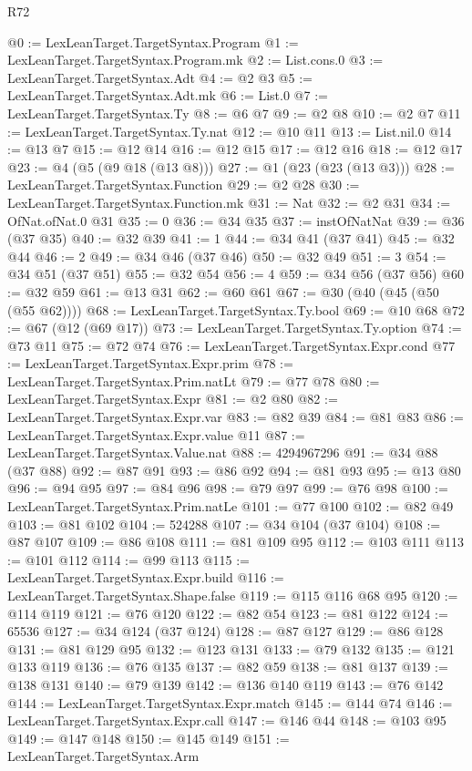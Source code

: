 \begin{lexlean}{R72}
\begin{coremodule}
@0 := LexLeanTarget.TargetSyntax.Program
@1 := LexLeanTarget.TargetSyntax.Program.mk
@2 := List.cons.{0}
@3 := LexLeanTarget.TargetSyntax.Adt
@4 := @2 @3
@5 := LexLeanTarget.TargetSyntax.Adt.mk
@6 := List.{0}
@7 := LexLeanTarget.TargetSyntax.Ty
@8 := @6 @7
@9 := @2 @8
@10 := @2 @7
@11 := LexLeanTarget.TargetSyntax.Ty.nat
@12 := @10 @11
@13 := List.nil.{0}
@14 := @13 @7
@15 := @12 @14
@16 := @12 @15
@17 := @12 @16
@18 := @12 @17
@23 := @4 (@5 (@9 @18 (@13 @8)))
@27 := @1 (@23 (@23 (@13 @3)))
@28 := LexLeanTarget.TargetSyntax.Function
@29 := @2 @28
@30 := LexLeanTarget.TargetSyntax.Function.mk
@31 := Nat
@32 := @2 @31
@34 := OfNat.ofNat.{0} @31
@35 := 0
@36 := @34 @35
@37 := instOfNatNat
@39 := @36 (@37 @35)
@40 := @32 @39
@41 := 1
@44 := @34 @41 (@37 @41)
@45 := @32 @44
@46 := 2
@49 := @34 @46 (@37 @46)
@50 := @32 @49
@51 := 3
@54 := @34 @51 (@37 @51)
@55 := @32 @54
@56 := 4
@59 := @34 @56 (@37 @56)
@60 := @32 @59
@61 := @13 @31
@62 := @60 @61
@67 := @30 (@40 (@45 (@50 (@55 @62))))
@68 := LexLeanTarget.TargetSyntax.Ty.bool
@69 := @10 @68
@72 := @67 (@12 (@69 @17))
@73 := LexLeanTarget.TargetSyntax.Ty.option
@74 := @73 @11
@75 := @72 @74
@76 := LexLeanTarget.TargetSyntax.Expr.cond
@77 := LexLeanTarget.TargetSyntax.Expr.prim
@78 := LexLeanTarget.TargetSyntax.Prim.natLt
@79 := @77 @78
@80 := LexLeanTarget.TargetSyntax.Expr
@81 := @2 @80
@82 := LexLeanTarget.TargetSyntax.Expr.var
@83 := @82 @39
@84 := @81 @83
@86 := LexLeanTarget.TargetSyntax.Expr.value @11
@87 := LexLeanTarget.TargetSyntax.Value.nat
@88 := 4294967296
@91 := @34 @88 (@37 @88)
@92 := @87 @91
@93 := @86 @92
@94 := @81 @93
@95 := @13 @80
@96 := @94 @95
@97 := @84 @96
@98 := @79 @97
@99 := @76 @98
@100 := LexLeanTarget.TargetSyntax.Prim.natLe
@101 := @77 @100
@102 := @82 @49
@103 := @81 @102
@104 := 524288
@107 := @34 @104 (@37 @104)
@108 := @87 @107
@109 := @86 @108
@111 := @81 @109 @95
@112 := @103 @111
@113 := @101 @112
@114 := @99 @113
@115 := LexLeanTarget.TargetSyntax.Expr.build
@116 := LexLeanTarget.TargetSyntax.Shape.false
@119 := @115 @116 @68 @95
@120 := @114 @119
@121 := @76 @120
@122 := @82 @54
@123 := @81 @122
@124 := 65536
@127 := @34 @124 (@37 @124)
@128 := @87 @127
@129 := @86 @128
@131 := @81 @129 @95
@132 := @123 @131
@133 := @79 @132
@135 := @121 @133 @119
@136 := @76 @135
@137 := @82 @59
@138 := @81 @137
@139 := @138 @131
@140 := @79 @139
@142 := @136 @140 @119
@143 := @76 @142
@144 := LexLeanTarget.TargetSyntax.Expr.match
@145 := @144 @74
@146 := LexLeanTarget.TargetSyntax.Expr.call
@147 := @146 @44
@148 := @103 @95
@149 := @147 @148
@150 := @145 @149
@151 := LexLeanTarget.TargetSyntax.Arm

\end{coremodule}
\end{lexlean}
